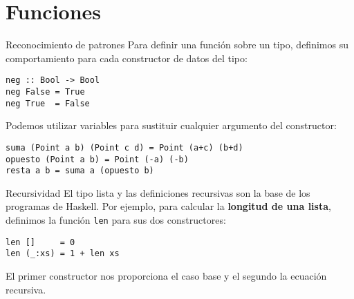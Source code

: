 \section{Funciones}

\begin{frame}[fragile]{Reconocimiento de patrones}
  Para definir una función sobre un tipo, definimos su comportamiento para cada
  constructor de datos del tipo:

  \espacio

  \begin{lstlisting}
neg :: Bool -> Bool
neg False = True
neg True  = False
  \end{lstlisting}

  \espacio
  
  Podemos utilizar variables para sustituir cualquier argumento del constructor:

  \espacio

  \begin{lstlisting}
suma (Point a b) (Point c d) = Point (a+c) (b+d)
opuesto (Point a b) = Point (-a) (-b)
resta a b = suma a (opuesto b)
  \end{lstlisting}
\end{frame}

\begin{frame}[fragile]{Recursividad}
  El tipo lista y las definiciones recursivas son la base de los programas de Haskell.
  Por ejemplo, para calcular la \textbf{longitud de una lista}, definimos la función
  \texttt{len} para sus dos constructores:

  \espacio

  \begin{lstlisting}
len []     = 0
len (_:xs) = 1 + len xs
  \end{lstlisting}

    \espacio

  El primer constructor nos proporciona el caso base y el segundo la ecuación recursiva.
\end{frame}
